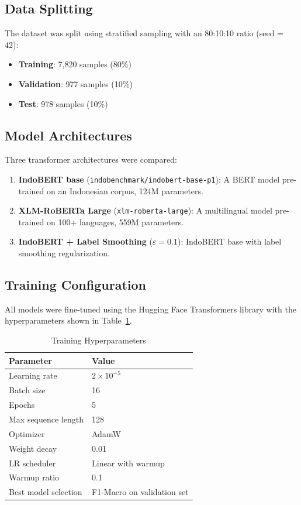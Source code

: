 \documentclass[10pt,twocolumn]{article}
\begin{document}
\subsection{Data Splitting}

The dataset was split using stratified sampling with an 80:10:10 ratio (seed = 42):
\begin{itemize}[leftmargin=*,nosep]
    \item \textbf{Training}: 7,820 samples (80\%)
    \item \textbf{Validation}: 977 samples (10\%)
    \item \textbf{Test}: 978 samples (10\%)
\end{itemize}

\subsection{Model Architectures}

Three transformer architectures were compared:

\begin{enumerate}[leftmargin=*,nosep]
    \item \textbf{IndoBERT base} (\texttt{indobenchmark/indobert-base-p1}): A BERT model pre-trained on an Indonesian corpus, 124M parameters.
    \item \textbf{XLM-RoBERTa Large} (\texttt{xlm-roberta-large}): A multilingual model pre-trained on 100+ languages, 559M parameters.
    \item \textbf{IndoBERT + Label Smoothing} ($\varepsilon=0.1$): IndoBERT base with label smoothing regularization.
\end{enumerate}

\subsection{Training Configuration}

All models were fine-tuned using the Hugging Face Transformers library with the hyperparameters shown in Table~\ref{tab:hyperparams}.

\begin{table}[H]
\centering
\caption{Training Hyperparameters}
\label{tab:hyperparams}
\begin{tabular}{ll}
\toprule
\textbf{Parameter} & \textbf{Value} \\
\midrule
Learning rate & $2 \times 10^{-5}$ \\
Batch size & 16 \\
Epochs & 5 \\
Max sequence length & 128 \\
Optimizer & AdamW \\
Weight decay & 0.01 \\
LR scheduler & Linear with warmup \\
Warmup ratio & 0.1 \\
Best model selection & F1-Macro on validation set \\
\bottomrule
\end{tabular}
\end{table}
\end{document}
